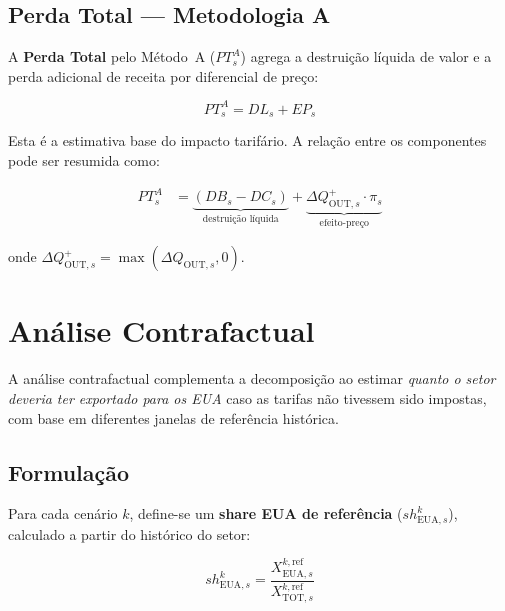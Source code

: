 \documentclass[12pt, a4paper]{article}
\begin{document}
\subsection{Perda Total — Metodologia A}
\label{sec:perda_total}

A \textbf{Perda Total} pelo Método~A (\(PT_s^A\)) agrega a destruição
líquida de valor e a perda adicional de receita por diferencial de preço:

\begin{equation}
  \boxed{
    PT_s^A = DL_s + EP_s
  }
  \label{eq:pt}
\end{equation}

Esta é a estimativa base do impacto tarifário. A relação entre os
componentes pode ser resumida como:

\begin{align}
  PT_s^A &= \underbrace{(DB_s - DC_s)}_{\text{destruição líquida}}
            + \underbrace{\Delta Q_{\text{OUT},s}^{+} \cdot \pi_s}_{\text{efeito-preço}}
  \label{eq:pt_expandida}
\end{align}

onde $\Delta Q_{\text{OUT},s}^{+} = \max(\Delta Q_{\text{OUT},s}, 0)$.

\section{Análise Contrafactual}
\label{sec:contrafactual}

A análise contrafactual complementa a decomposição ao estimar \emph{quanto
o setor deveria ter exportado para os EUA} caso as tarifas não tivessem
sido impostas, com base em diferentes janelas de referência histórica.

\subsection{Formulação}

Para cada cenário \(k\), define-se um \textbf{share EUA de referência}
(\(sh_{\text{EUA},s}^{k}\)), calculado a partir do histórico do setor:

\begin{equation}
  sh_{\text{EUA},s}^{k} = \frac{X_{\text{EUA},s}^{k,\text{ref}}}
                                {X_{\text{TOT},s}^{k,\text{ref}}}
  \label{eq:share_ref}
\end{equation}
\end{document}
